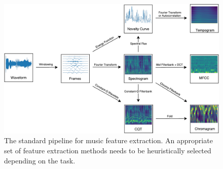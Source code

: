 \begin{figure}[t]
	\includegraphics[width=\textwidth]{pipeline.pdf}
	\caption{\small The standard pipeline for music feature extraction. An appropriate set of feature extraction methods needs to be heuristically selected depending on the task.}\label{fig:pipeline}
\end{figure}

